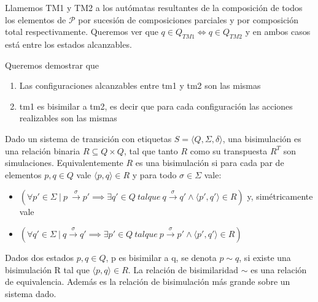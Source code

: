 Llamemos TM1 y TM2 a los autómatas resultantes de la composición de todos los elementos de $\mathcal{P}$ por sucesión de composiciones parciales y por composición total respectivamente. Queremos ver que $ q \in Q_{TM1} \iff q \in Q_{TM2} $ y en ambos casos está entre los estados alcanzables. 

Queremos demostrar que
\begin{enumerate}
\item Las configuraciones alcanzables entre tm1 y tm2 son las mismas
\item tm1 es bisimilar a tm2, es decir que para cada configuración las acciones realizables son las mismas
\end{enumerate}

\begin{definition}[Bisimulación]
Dado un sistema de transición con etiquetas $ S =\langle Q, \Sigma, \delta \rangle $, una bisimulación es una relación binaria $R \subseteq Q \times Q$, tal que tanto $R$ como su transpuesta $R^T$ son simulaciones. Equivalentemente $R$ es una bisimulación si para cada par de elementos $p, q \in Q$ vale $\langle p, q \rangle \in R$ y para todo $\sigma \in \Sigma $ vale:
\begin{itemize}
    \item $(\forall p' \in \Sigma \  | \  p \ \overset{\sigma}{\rightarrow} p' \implies \exists q'\in Q \ \mathit{tal que} \ q \overset{\sigma}{\rightarrow} q' \land \langle p', q' \rangle \in R )$ y, simétricamente vale 
    \item $(\forall q' \in \Sigma \  | \  q \overset{\sigma}{\rightarrow} q' \implies \exists p'\in Q \ \mathit{tal que} \ p \overset{\sigma}{\rightarrow} p' \land \langle p', q' \rangle \in R ) $
\end{itemize}

Dados dos estados $p, q \in Q $, p es bisimilar a q, se denota $p \sim q $, si existe una bisimulación R tal que $\langle p,q \rangle \in R$. La relación de bisimilaridad $\sim$ es una relación de equivalencia. Además es la relación de bisimulación más grande sobre un sistema dado.

\end{definition}
